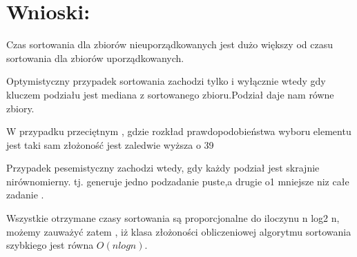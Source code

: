 \documentclass[11pt]{article}
\begin{document}
\section{Wnioski:}
\itemize
\item Czas sortowania dla zbiorów nieuporządkowanych jest dużo większy od czasu sortowania dla zbiorów uporządkowanych.
\item Optymistyczny przypadek sortowania zachodzi tylko i wyłącznie wtedy gdy kluczem podziału jest mediana z sortowanego zbioru.Podział daje nam równe zbiory.
\item W przypadku przeciętnym , gdzie rozkład prawdopodobieństwa wyboru elementu jest taki sam złożoność jest zaledwie wyższa o 39%
\item Przypadek pesemistyczny zachodzi wtedy, gdy każdy podział jest skrajnie nirównomierny. tj. generuje jedno podzadanie puste,a drugie o1 mniejsze niz całe zadanie .
\item Wszystkie otrzymane czasy sortowania są proporcjonalne do iloczynu n log2 n, możemy zauważyć zatem , iż klasa złożoności obliczeniowej algorytmu sortowania szybkiego jest równa $O(n log n)$.


 
\end{document}
